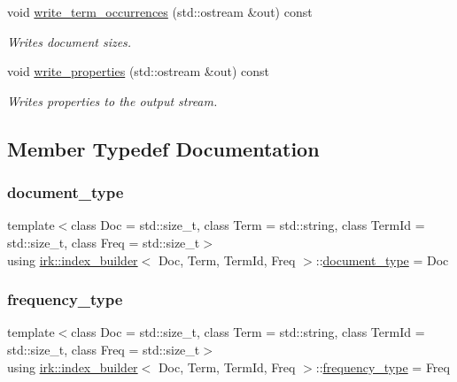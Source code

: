 \begin{DoxyCompactItemize}
void \mbox{\hyperlink{classirk_1_1index__builder_a624ac52ee94b6d6e9b3a7c2521d550a1}{write\+\_\+term\+\_\+occurrences}} (std\+::ostream \&out) const
\begin{DoxyCompactList}\small\item\em Writes document sizes. \end{DoxyCompactList}\item 
void \mbox{\hyperlink{classirk_1_1index__builder_a72af15b21025b78e52b36ba27d1a74c9}{write\+\_\+properties}} (std\+::ostream \&out) const
\begin{DoxyCompactList}\small\item\em Writes properties to the output stream. \end{DoxyCompactList}\end{DoxyCompactItemize}


\subsection{Member Typedef Documentation}
\mbox{\label{classirk_1_1index__builder_a4230ae91e9f84c95ee99b3607c6e952e}} 
\subsubsection{\texorpdfstring{document\+\_\+type}{document\_type}}
{\footnotesize\ttfamily template$<$class Doc  = std\+::size\+\_\+t, class Term  = std\+::string, class Term\+Id  = std\+::size\+\_\+t, class Freq  = std\+::size\+\_\+t$>$ \\
using \mbox{\hyperlink{classirk_1_1index__builder}{irk\+::index\+\_\+builder}}$<$ Doc, Term, Term\+Id, Freq $>$\+::\mbox{\hyperlink{classirk_1_1index__builder_a4230ae91e9f84c95ee99b3607c6e952e}{document\+\_\+type}} =  Doc}

\mbox{\label{classirk_1_1index__builder_af2efa68fc3f10fd9cb000d16279bfbb1}} 
\subsubsection{\texorpdfstring{frequency\+\_\+type}{frequency\_type}}
{\footnotesize\ttfamily template$<$class Doc  = std\+::size\+\_\+t, class Term  = std\+::string, class Term\+Id  = std\+::size\+\_\+t, class Freq  = std\+::size\+\_\+t$>$ \\
using \mbox{\hyperlink{classirk_1_1index__builder}{irk\+::index\+\_\+builder}}$<$ Doc, Term, Term\+Id, Freq $>$\+::\mbox{\hyperlink{classirk_1_1index__builder_af2efa68fc3f10fd9cb000d16279bfbb1}{frequency\+\_\+type}} =  Freq}

